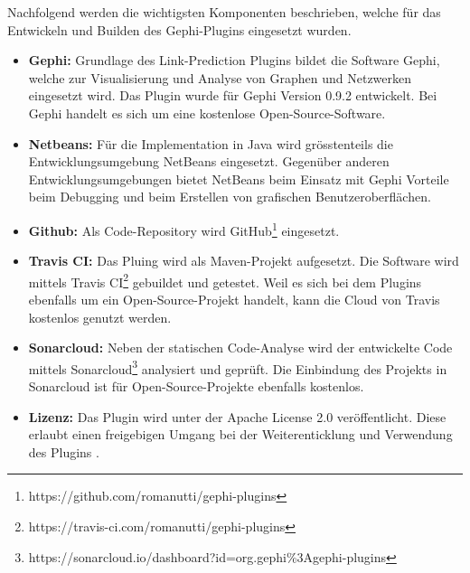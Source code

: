 Nachfolgend werden die wichtigsten Komponenten beschrieben, welche für das Entwickeln und Builden des Gephi-Plugins eingesetzt wurden.

\begin{itemize}
    \item \textbf{Gephi:} Grundlage des Link-Prediction Plugins bildet die Software Gephi, welche zur Visualisierung und Analyse von Graphen und Netzwerken eingesetzt wird. Das Plugin wurde für Gephi Version 0.9.2 entwickelt. Bei Gephi handelt es sich um eine kostenlose Open-Source-Software.
    \item \textbf{Netbeans:} Für die Implementation in Java wird grösstenteils die Entwicklungsumgebung NetBeans eingesetzt. Gegenüber anderen Entwicklungsumgebungen bietet NetBeans beim Einsatz mit Gephi Vorteile beim Debugging und beim Erstellen von grafischen Benutzeroberflächen.
    \item \textbf{Github:} Als Code-Repository wird GitHub\footnote{https://github.com/romanutti/gephi-plugins} eingesetzt.
    \item \textbf{Travis CI:} Das Pluing wird als Maven-Projekt aufgesetzt. Die Software wird mittels Travis CI\footnote{https://travis-ci.com/romanutti/gephi-plugins} gebuildet und getestet. Weil es sich bei dem Plugins ebenfalls um ein Open-Source-Projekt handelt, kann die Cloud von Travis kostenlos genutzt werden.
    \item \textbf{Sonarcloud:} Neben der statischen Code-Analyse wird der entwickelte Code mittels Sonarcloud\footnote{https://sonarcloud.io/dashboard?id=org.gephi\%3Agephi-plugins} analysiert und geprüft. Die Einbindung des Projekts in Sonarcloud ist für Open-Source-Projekte ebenfalls kostenlos.
    \item \textbf{Lizenz:} Das Plugin wird unter der Apache License 2.0 veröffentlicht. Diese erlaubt einen freigebigen Umgang bei der Weiterenticklung und Verwendung des Plugins \cite{noauthor_comparison_2019}.
\end{itemize}
